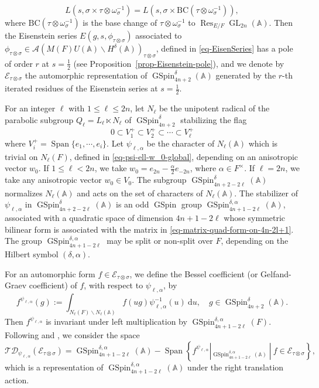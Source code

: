 \documentclass[12pt]{amsart}
\newcommand{\A}{\mathbb{A}}
\newcommand{\Res}{\operatorname{Res}}
\newcommand{\Span}{\operatorname{Span}}
\newcommand{\BC}{\mathrm{BC}}
\newcommand{\TD}{\mathcal{TD}}
\newcommand{\CE}{{\mathcal{E}}}
\theoremstyle{remark}
\DeclareMathOperator{\GL}{GL}
\DeclareMathOperator{\GSpin}{GSpin}
\newcommand{\bs}{\backslash}
\begin{document}
 \begin{equation*}
 	L(s,\sigma\times\tau\otimes \omega_{\sigma}^{-1})= L(s, \sigma\times \BC(\tau\otimes \omega_{\sigma}^{-1})),
 \end{equation*}
 where $\BC(\tau\otimes \omega_{\sigma}^{-1})$ is the base change of $\tau\otimes \omega_{\sigma}^{-1}$ to $\Res_{E/F}\GL_{2n}(\A)$. Then the Eisenstein series $E(g, s, \phi_{\tau\otimes\sigma})$ associated to $\phi_{\tau\otimes\sigma}\in \mathcal{A}(M(F)U(\A)\bs H^\delta(\A))_{\tau\otimes \sigma}$, defined in \eqref{eq-EisenSeries} has a pole of order $r$ at $s=\frac{1}{2}$ (see Proposition~\ref{prop-Eisenstein-pole}), and we denote by $\CE_{\tau\otimes \sigma}$ the automorphic representation of $\GSpin_{4n+2}^\delta(\A)$ generated by the $r$-th iterated residues of the Eisenstein series at $s=\frac{1}{2}$.

For an integer $\ell$ with $1\le \ell\le 2n$, let $N_{\ell}$ be the unipotent radical of the parabolic subgroup $Q_\ell=L_{{\ell}}\ltimes N_{{\ell}}$ of $\GSpin_{4n+2}^{\delta}$ stabilizing the flag
\begin{equation*}
0\subset V_1^+ \subset V_2^+ \subset \cdots \subset 	V_{\ell}^+
\end{equation*}
where $V_i^+=\Span\{e_1, \cdots, e_i\}$. 
Let $\psi_{\ell,\alpha}$ be the character of $N_{\ell}(\A)$ which is trivial on $N_{\ell}(F)$, defined in \eqref{eq-psi-ell-w_0-global}, depending on an anisotropic vector $w_0$. If $1\le \ell <2n$, we take $w_0=e_{2n}-\frac{\alpha}{2}e_{-2n}$, where $\alpha\in F^\times$. If $\ell=2n$, we take any anisotropic vector $w_0\in V_0$. The subgroup $\GSpin_{4n+2-2\ell}^{\delta}(\A)$ normalizes $N_{\ell}(\A)$ and acts on the set of characters of $N_{\ell}(\A)$. The stabilizer of $\psi_{\ell,\alpha}$ in $\GSpin_{4n+2-2\ell}^{\delta}(\A)$ is an odd $\GSpin$ group $\GSpin_{4n+1-2\ell}^{\delta,\alpha}(\A)$, associated with a quadratic space of dimension $4n+1-2\ell$ whose symmetric bilinear form is associated with the matrix in \eqref{eq-matrix-quad-form-on-4n-2l+1}. The group $\GSpin_{4n+1-2\ell}^{\delta,\alpha}$ may be split or non-split over $F$, depending on the Hilbert symbol $(\delta,\alpha)$.

For an automorphic form $f\in \CE_{\tau\otimes \sigma}$, we define the Bessel coefficient (or Gelfand-Graev coefficient) of $f$, with respect to $ \psi_{\ell,\alpha}$, 
by
\begin{equation*}
 f^{\psi_{\ell, \alpha}}(g):=\int_{N_\ell(F)\backslash  N_{\ell}(\A)} f(ug)\psi_{\ell,\alpha}^{-1}(u)\ \mathrm{d}u, \quad g\in \GSpin_{4n+2}^{\delta}(\A).
\end{equation*}
Then $f^{\psi_{\ell, \alpha}}$ is invariant under left multiplication by $\GSpin_{4n+1-2\ell}^{\delta,\alpha}(F)$. Following \cite[\S 3.1]{GinzburgRallisSoudry2011} and \cite[\S 1.2]{JiangLiuXuZhang2016}, we consider the space 
$$
\TD_{\psi_{\ell,\alpha}}(\CE_{\tau\otimes \sigma})=\GSpin_{4n+1-2\ell}^{\delta,\alpha}(\A)-\Span \left\{f^{\psi_{\ell, \alpha}}|_{\GSpin_{4n+1-2\ell}^{\delta,\alpha}(\A)}\ | \ f\in \CE_{\tau\otimes \sigma} \right\},
$$
which is a representation of $\GSpin_{4n+1-2\ell}^{\delta,\alpha}(\A)$ under the right translation action. 
\end{document}

